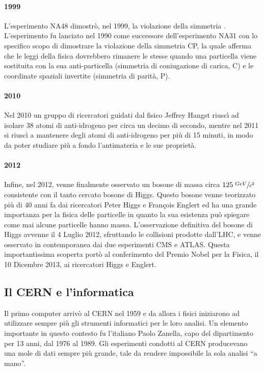 			\paragraph{1999}L'esperimento NA48 dimostrò, nel 1999, la violazione della simmetria . L'esperimento fu lanciato nel 1990 come successore dell'esperimento NA31 con lo specifico scopo di dimostrare la violazione della simmetria \ac{CP}, la quale afferma che le leggi della fisica dovrebbero rimanere le stesse quando una particella viene sostituita con la sua anti-particella (simmetria di coniugazione di carica, C) e le coordinate spaziali invertite (simmetria di parità, P).
			
			\paragraph{2010}Nel 2010 un gruppo di ricercatori guidati dal fisico Jeffrey Hangst riuscì ad isolare 38 atomi di anti-idrogeno per circa un decimo di secondo, mentre nel 2011 si riuscì a mantenere degli atomi di anti-idrogeno per più di 15 minuti, in modo da poter studiare più a fondo l'antimateria e le sue proprietà.
			
			\paragraph{2012}Infine, nel 2012, venne finalmente osservato un bosone di massa circa $125 \; \sfrac{GeV}{c^2}$ consistente con il tanto cercato bosone di Higgs. Questo bosone venne teorizzato più di 40 anni fa dai ricercatori Peter Higgs e François Englert ed ha una grande importanza per la fisica delle particelle in quanto la sua esistenza può spiegare come mai alcune particelle hanno massa. L'osservazione definitiva del bosone di Higgs avvenne il 4 Luglio 2012, sfruttando le collisioni prodotte dall'\ac{LHC}, e venne osservato in contemporanea dai due esperimenti \ac{CMS} e \ac{ATLAS}. Questa importantissima scoperta portò al conferimento del Premio Nobel per la Fisica, il 10 Dicembre 2013, ai ricercatori Higgs e Englert.
			
		\subsection{Il CERN e l'informatica} \label{subsec:C;s;informatica}
		
			Il primo computer arrivò al \ac{CERN} nel 1959 e da allora i fisici iniziarono ad utilizzare sempre più gli strumenti informatici per le loro analisi. Un elemento importante in questo contesto fu l'italiano Paolo Zanella, capo del dipartimento  per 13 anni, dal 1976 al 1989. Gli esperimenti condotti al \ac{CERN} producevano una mole di dati sempre più grande, tale da rendere impossibile la sola analisi ``a mano''.
			
